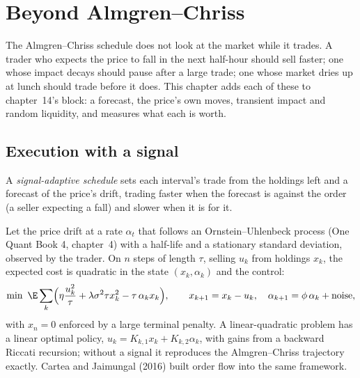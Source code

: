 \chapter{Beyond Almgren--Chriss}\label{ch:mx:beyond-almgren-chriss}

The Almgren--Chriss schedule does not look at the market while it trades. A trader who expects the price to fall in the next half-hour should sell
faster; one whose impact decays should pause after a large trade; one whose market dries up at lunch should trade before it does. This chapter adds
each of these to chapter~14's block: a forecast, the price's own moves, transient impact and random liquidity, and measures what each is worth.

\section{Execution with a signal}

\begin{definition}\label{def:mx:beyond-almgren-chriss:signal}
A \emph{signal-adaptive schedule} sets each interval's trade from the holdings left and a forecast of the price's drift,
trading faster when the forecast is against the order (a seller expecting a fall) and slower when it is for it.
\end{definition}

Let the price drift at a rate $\alpha_t$ that follows an Ornstein--Uhlenbeck process (One Quant Book 4, chapter~4) with a half-life and a stationary
standard deviation, observed by the trader. On $n$ steps of length $\tau$, selling $u_k$ from holdings $x_k$, the expected cost is quadratic in the state
$(x_k,\alpha_k)$ and the control:
\[
\min\ \E\sum_k\Bigl(\eta\frac{u_k^2}{\tau}+\lambda\sigma^2\tau x_k^2-\tau\,\alpha_kx_k\Bigr),\qquad x_{k+1}=x_k-u_k,\quad \alpha_{k+1}=\phi\,\alpha_k+\text{noise},
\]
with $x_n=0$ enforced by a large terminal penalty. A linear-quadratic problem has a linear optimal policy, $u_k=K_{k,1}x_k+K_{k,2}\alpha_k$, with gains from a
backward Riccati recursion; without a signal it reproduces the Almgren--Chriss trajectory exactly. Cartea and Jaimungal (2016) built order flow into the
same framework.

\label{lst:mx:beyond-almgren-chriss:lqr}

